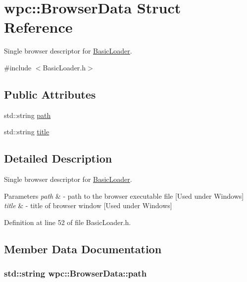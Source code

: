 \hypertarget{structwpc_1_1_browser_data}{\section{wpc\-:\-:Browser\-Data Struct Reference}
\label{structwpc_1_1_browser_data}
}


Single browser descriptor for \hyperlink{classwpc_1_1_basic_loader}{Basic\-Loader}.  




{\ttfamily \#include $<$Basic\-Loader.\-h$>$}

\subsection*{Public Attributes}
\begin{DoxyCompactItemize}
\item 
std\-::string \hyperlink{structwpc_1_1_browser_data_acb4697a7edf8cec585be45a5abdaac27}{path}
\item 
std\-::string \hyperlink{structwpc_1_1_browser_data_a7d1185398cb655f8d8e874ca34c5e852}{title}
\end{DoxyCompactItemize}


\subsection{Detailed Description}
Single browser descriptor for \hyperlink{classwpc_1_1_basic_loader}{Basic\-Loader}. 


\begin{DoxyParams}{Parameters}
{\em path} & -\/ path to the browser executable file \mbox{[}Used under Windows\mbox{]} \\
\hline
{\em title} & -\/ title of browser window \mbox{[}Used under Windows\mbox{]} \\
\hline
\end{DoxyParams}


Definition at line 52 of file Basic\-Loader.\-h.



\subsection{Member Data Documentation}
\hypertarget{structwpc_1_1_browser_data_acb4697a7edf8cec585be45a5abdaac27}{
\subsubsection[{path}]{\setlength{\rightskip}{0pt plus 5cm}std\-::string wpc\-::\-Browser\-Data\-::path}}\label{structwpc_1_1_browser_data_acb4697a7edf8cec585be45a5abdaac27}


